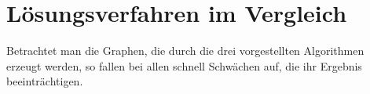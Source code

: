 \section{Lösungsverfahren im Vergleich}
Betrachtet man die Graphen, die durch die drei vorgestellten Algorithmen erzeugt werden, so fallen bei allen schnell Schwächen auf, die ihr Ergebnis beeinträchtigen.

